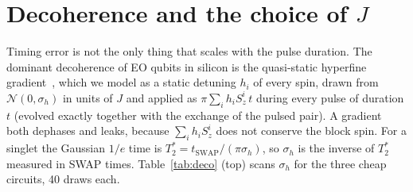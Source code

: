 \documentclass[reprint,aps,pra,amsmath,amssymb,superscriptaddress,letterpaper]{revtex4-2}
\newcommand{\tsw}{t_{\mathrm{SWAP}}}
\begin{document}
\section{Decoherence and the choice of $J$}
\label{sec:deco}

Timing error is not the only thing that scales with the pulse duration. The
dominant decoherence of EO qubits in silicon is the quasi-static hyperfine
gradient~\cite{andrews2019,weinstein2023}, which we model as a static
detuning $h_i$ of every spin, drawn from $\mathcal N(0,\sigma_h)$ in units of
$J$ and applied as $\pi\sum_i h_i S_z^i\,t$ during every pulse of duration $t$
(evolved exactly together with the exchange of the pulsed pair). A gradient both dephases and leaks, because
$\sum_i h_iS^i_z$ does not conserve the block spin. For a singlet the Gaussian
$1/e$ time is $T_2^*=\tsw/(\pi\sigma_h)$, so $\sigma_h$ is the inverse of
$T_2^*$ measured in SWAP times. Table~\ref{tab:deco} (top) scans $\sigma_h$
for the three cheap circuits, 40 draws each.
\end{document}
